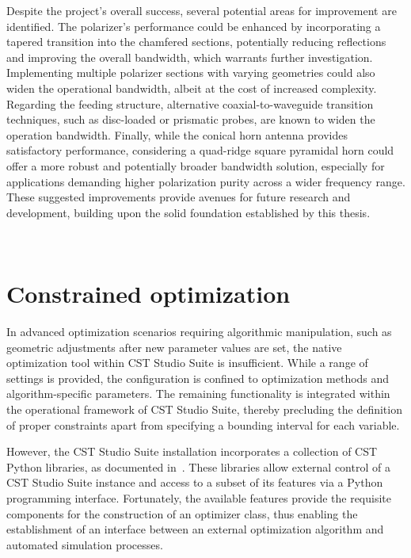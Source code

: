 \documentclass[11pt,a4paper,twoside,openany]{report}
\begin{document}
Despite the project's overall success, several potential areas for improvement are identified. The polarizer's performance could be enhanced by incorporating a tapered transition into the chamfered sections, potentially reducing reflections and improving the overall bandwidth, which warrants further investigation. Implementing multiple polarizer sections with varying geometries could also widen the operational bandwidth, albeit at the cost of increased complexity. Regarding the feeding structure, alternative coaxial-to-waveguide transition techniques, such as disc-loaded or prismatic probes, are known to widen the operation bandwidth. Finally, while the conical horn antenna provides satisfactory performance, considering a quad-ridge square pyramidal horn could offer a more robust and potentially broader bandwidth solution, especially for applications demanding higher polarization purity across a wider frequency range. These suggested improvements provide avenues for future research and development, building upon the solid foundation established by this thesis.

\newpage\ \newpage
\appendix
\chapter{Constrained optimization}
\label{appendix:constrained-optimization}
In advanced optimization scenarios requiring algorithmic manipulation, such as geometric adjustments after new parameter values are set, the native optimization tool within CST Studio Suite is insufficient. While a range of settings is provided, the configuration is confined to optimization methods and algorithm-specific parameters. The remaining functionality is integrated within the operational framework of CST Studio Suite, thereby precluding the definition of proper constraints apart from specifying a bounding interval for each variable.

However, the CST Studio Suite installation incorporates a collection of CST Python libraries, as documented in~\parencite{cst:python-libraries-documentation}. These libraries allow external control of a CST Studio Suite instance and access to a subset of its features via a Python programming interface. Fortunately, the available features provide the requisite components for the construction of an optimizer class, thus enabling the establishment of an interface between an external optimization algorithm and automated simulation processes.
\end{document}
